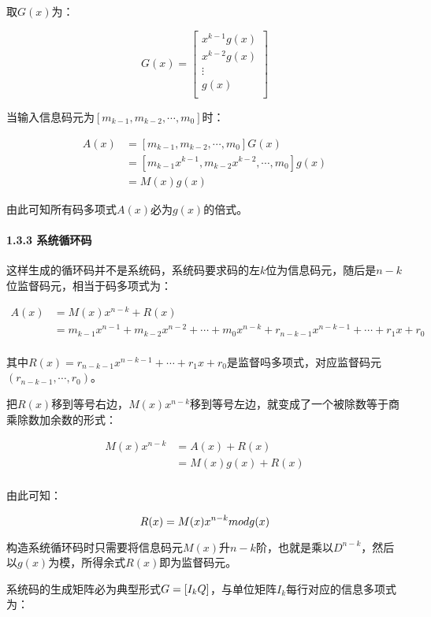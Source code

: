 \documentclass[
]{article}
\begin{document}
取\(G(x)\)为：

\[G(x)=
\left[
\begin{matrix}
x^{k-1}g(x)\\
x^{k-2}g(x)\\
 \vdots \\
g(x)\\
\end{matrix}
\right]\]

当输入信息码元为\([m_{k-1},m_{k-2},\cdots,m_0]\)时：

\begin{align}
A(x)&=[m_{k-1},m_{k-2},\cdots,m_0]G(x)\\
    &=[m_{k-1}x^{k-1},m_{k-2}x^{k-2},\cdots,m_0]g(x)\\
    &=M(x)g(x)
\end{align}

由此可知所有码多项式\(A(x)\)必为\(g(x)\)的倍式。

\hypertarget{header-n61}{%
\paragraph{1.3.3 系统循环码}\label{header-n61}}

这样生成的循环码并不是系统码，系统码要求码的左\(k\)位为信息码元，随后是\(n-k\)位监督码元，相当于码多项式为：

\begin{align}
A(x)&=M(x)x^{n-k}+R(x)\\
    &=m_{k-1}x^{n-1}+m_{k-2}x^{n-2}+\cdots+m_0x^{n-k}+r_{n-k-1}x^{n-k-1}+\cdots+r_1x+r_0\\
\end{align}

其中\(R(x)=r_{n-k-1}x^{n-k-1}+\cdots+r_1x+r_0\)是监督吗多项式，对应监督码元\((r_{n-k-1},\cdots,r_{0})\)。

把\(R(x)\)移到等号右边，\(M(x)x^{n-k}\)移到等号左边，就变成了一个被除数等于商乘除数加余数的形式：

\begin{align}
M(x)x^{n-k}&=A(x)+R(x)\\
    	&=M(x)g(x)+R(x)\\
\end{align}

由此可知：

\[R(x)=M(x)x^{n-k} \space mod \space g(x)\]

构造系统循环码时只需要将信息码元\(M(x)\)升\(n-k\)阶，也就是乘以\(D^{n-k}\)，然后以\(g(x)\)为模，所得余式\(R(x)\)即为监督码元。

系统码的生成矩阵必为典型形式\(G=[I_k \space Q]\)，与单位矩阵\(I_k\)每行对应的信息多项式为：
\end{document}
